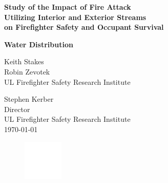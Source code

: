 \documentclass{article}
\begin{document}

	
	\begin{titlepage}
		
		\pagecolor{ULred}\afterpage{\nopagecolor}
		


			\vspace*{20\baselineskip} 

		\huge
		\begin{adjustwidth}{-0.5in}{-0in}
		\color{white}
		\textbf{Study of the Impact of Fire Attack \\ Utilizing Interior and Exterior Streams \\ on Firefighter Safety and Occupant Survival}
		\end{adjustwidth}
		\huge
		\begin{adjustwidth}{-0.5in}{-0in}
		\color{white}
		\textbf{Water Distribution}
		\end{adjustwidth}
		\begin{adjustwidth}{-0.5in}{}
		\color{white}
		\vspace{.2\baselineskip}
		\large
		Keith Stakes \\
		Robin Zevotek \\
		UL Firefighter Safety Research Institute \\
		\vspace*{4\baselineskip}

		Stephen Kerber \\
		Director \\
		UL Firefighter Safety Research Institute \\

		\vspace*{.8\baselineskip}	
		\today
		\vspace*{.8\baselineskip}
		\begin{figure}[h]
			\hspace*{-0.5in}\includegraphics[width=0.75in]{Figures/General/ULLogoWhite.pdf}
		\end{figure}
		\end{adjustwidth}
	\end{titlepage}
\end{document}
